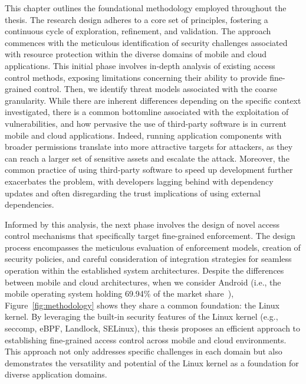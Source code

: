 This chapter outlines the foundational methodology employed throughout
the thesis. The research design adheres to a core set of principles,
fostering a continuous cycle of exploration, refinement, and
validation. The approach commences with the meticulous identification
of security challenges associated with resource protection within the
diverse domains of mobile and cloud applications. This initial phase
involves in-depth analysis of existing access control methods,
exposing limitations concerning their ability to provide fine-grained
control. Then, we identify threat models associated with the coarse
granularity. While there are inherent differences depending on the
specific context investigated, there is a common bottomline associated
with the exploitation of vulnerabilities, and how pervasive the use of
third-party software is in current mobile and cloud applications.
Indeed, running application components with broader permissions
translate into more attractive targets for attackers, as they can
reach a larger set of sensitive assets and escalate the attack.
Moreover, the common practice of using third-party software to speed
up development further exacerbates the problem, with developers
lagging behind with dependency updates and often disregarding the
trust implications of using external dependencies. %

Informed by this analysis, the next phase involves the design of novel
access control mechanisms that specifically target fine-grained
enforcement. The design process encompasses the meticulous evaluation
of enforcement models, creation of security policies, and careful
consideration of integration strategies for seamless operation within
the established system architectures. Despite the differences between
mobile and cloud architectures, when we consider Android (i.e., the
mobile operating system holding 69.94\% of the market
share~\cite{android-os-marker-share}), Figure~\ref{fig:methodology}
shows they share a common foundation: the Linux kernel. By leveraging
the built-in security features of the Linux kernel (e.g., seccomp,
eBPF, Landlock, SELinux), this thesis proposes an efficient approach
to establishing fine-grained access control across mobile and cloud
environments. This approach not only addresses specific challenges in
each domain but also demonstrates the versatility and potential of the
Linux kernel as a foundation for diverse application domains.

